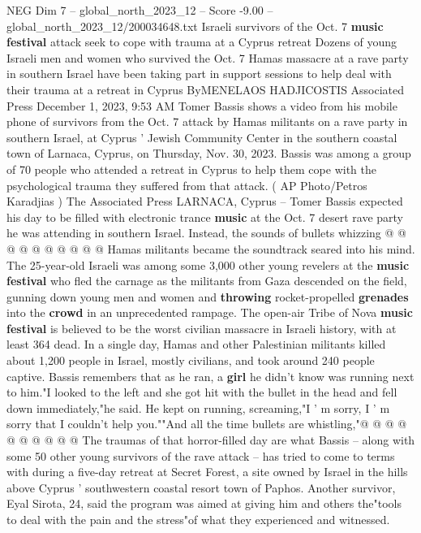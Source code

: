 \begin{textsample}{NEG Dim 7 – global\_north\_2023\_12 – Score -9.00 – global\_north\_2023\_12/200034648.txt}  \label{ex:f7_neg_147}
Israeli survivors of the Oct. 7 \textbf{music} \textbf{festival} attack seek to cope with trauma at a Cyprus retreat Dozens of young Israeli men and women who survived the Oct. 7 Hamas massacre at a rave party in southern Israel have been taking part in support sessions to help deal with their trauma at a retreat in Cyprus ByMENELAOS HADJICOSTIS Associated Press December 1, 2023, 9:53 AM Tomer Bassis shows a video from his mobile phone of survivors from the Oct. 7 attack by Hamas militants on a rave party in southern Israel, at Cyprus ' Jewish Community Center in the southern coastal town of Larnaca, Cyprus, on Thursday, Nov. 30, 2023.
Bassis was among a group of 70 people who attended a retreat in Cyprus to help them cope with the psychological trauma they suffered from that attack. ( AP Photo/Petros Karadjias ) The Associated Press LARNACA, Cyprus -- Tomer Bassis expected his day to be filled with electronic trance \textbf{music} at the Oct. 7 desert rave party he was attending in southern Israel.
Instead, the sounds of bullets whizzing @ @ @ @ @ @ @ @ @ @ Hamas militants became the soundtrack seared into his mind.
The 25-year-old Israeli was among some 3,000 other young revelers at the \textbf{music} \textbf{festival} who fled the carnage as the militants from Gaza descended on the field, gunning down young men and women and \textbf{throwing} rocket-propelled \textbf{grenades} into the \textbf{crowd} in an unprecedented rampage.
The open-air Tribe of Nova \textbf{music} \textbf{festival} is believed to be the worst civilian massacre in Israeli history, with at least 364 dead.
In a single day, Hamas and other Palestinian militants killed about 1,200 people in Israel, mostly civilians, and took around 240 people captive.
Bassis remembers that as he ran, a \textbf{girl} he didn't know was running next to him."I looked to the left and she got hit with the bullet in the head and fell down immediately,"he said.
He kept on running, screaming,"I ' m sorry, I ' m sorry that I couldn't help you.""And all the time bullets are whistling,"@ @ @ @ @ @ @ @ @ @ The traumas of that horror-filled day are what Bassis -- along with some 50 other young survivors of the rave attack -- has tried to come to terms with during a five-day retreat at Secret Forest, a site owned by Israel in the hills above Cyprus ' southwestern coastal resort town of Paphos.
Another survivor, Eyal Sirota, 24, said the program was aimed at giving him and others the"tools to deal with the pain and the stress"of what they experienced and witnessed.

\end{textsample}
